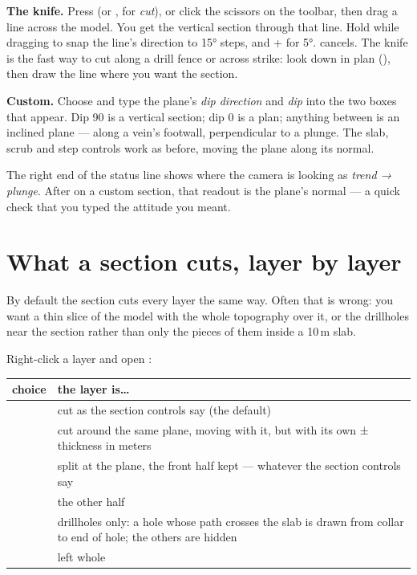 \textbf{The knife.} Press  (or , for \emph{cut}), or click the scissors on the toolbar, then drag a line across the model. You get the vertical section through that line. Hold  while dragging to snap the line's direction to 15° steps, and + for 5°.  cancels. The knife is the fast way to cut along a drill fence or across strike: look down in plan (), then draw the line where you want the section.

\textbf{Custom.} Choose  and type the plane's \emph{dip direction} and \emph{dip} into the two boxes that appear. Dip 90 is a vertical section; dip 0 is a plan; anything between is an inclined plane — along a vein's footwall, perpendicular to a plunge. The slab, scrub and step controls work as before, moving the plane along its normal.

\begin{tip}
The right end of the status line shows where the camera is looking as \emph{trend → plunge}. After  on a custom section, that readout is the plane's normal — a quick check that you typed the attitude you meant.
\end{tip}

\section{What a section cuts, layer by layer}\label{sec:sections-layers}
By default the section cuts every layer the same way. Often that is wrong: you want a thin slice of the model with the whole topography over it, or the drillholes near the section rather than only the pieces of them inside a 10\,m slab.

Right-click a layer and open :

\begin{center}
\begin{tabularx}{\linewidth}{@{}lL@{}}\toprule
choice & the layer is… \\ \midrule
{} & cut as the section controls say (the default) \\
 & cut around the same plane, moving with it, but with its own ± thickness in meters \\
 & split at the plane, the front half kept — whatever the section controls say \\
 & the other half \\
 & drillholes only: a hole whose path crosses the slab is drawn from collar to end of hole; the others are hidden \\
 & left whole \\ \bottomrule
\end{tabularx}
\end{center}

